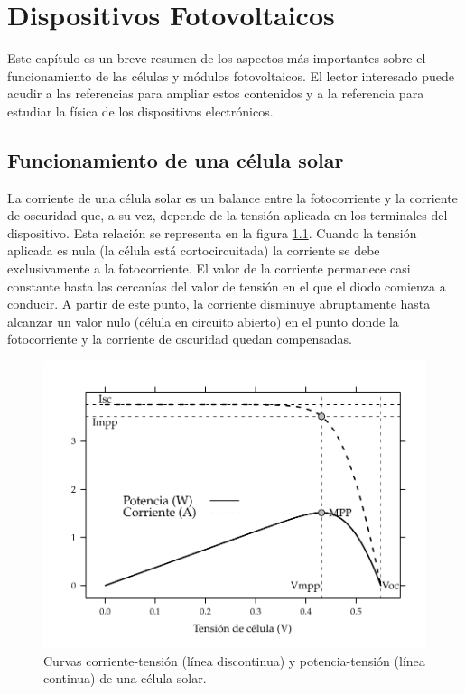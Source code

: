 \chapter{Dispositivos Fotovoltaicos\label{cha:DispositivosFotovoltaicos}}

Este capítulo es un breve resumen de los aspectos más importantes
sobre el funcionamiento de las células y módulos fotovoltaicos. El
lector interesado puede acudir a las referencias \citep{Lorenzo2006c,Green1995,Wenham.Green.ea2000}
para ampliar estos contenidos y a la referencia \citep{LopezAraujo1986}
para estudiar la física de los dispositivos electrónicos.


\section{Funcionamiento de una célula solar}

La corriente de una célula solar es un balance entre la fotocorriente
y la corriente de oscuridad que, a su vez, depende de la tensión aplicada
en los terminales del dispositivo. Esta relación se representa en
la figura \ref{fig:CurvaIVCelula}. Cuando la tensión aplicada es
nula (la célula está cortocircuitada) la corriente se debe exclusivamente
a la fotocorriente. El valor de la corriente permanece casi constante
hasta las cercanías del valor de tensión en el que el diodo comienza
a conducir. A partir de este punto, la corriente disminuye abruptamente
hasta alcanzar un valor nulo (célula en circuito abierto) en el punto
donde la fotocorriente y la corriente de oscuridad quedan compensadas. 


%
\begin{figure}
\begin{centering}
\includegraphics[scale=0.75]{../figs/CurvaIV_Ta20_G800}
\end{centering}

\caption[Curvas corriente-tensión y potencia-tensión de una célula solar]{Curvas corriente-tensión (línea discontinua) y potencia-tensión (línea
continua) de una célula solar.\label{fig:CurvaIVCelula}}

\end{figure}



